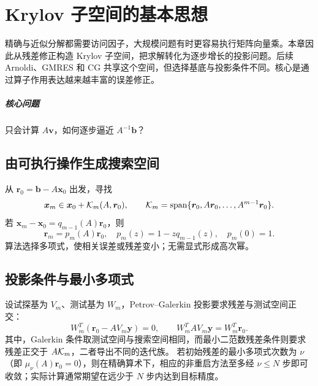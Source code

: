 \chapter{Krylov 子空间的基本思想}\label{v0ch:10}
\begin{chaptersummary}
精确与近似分解都需要访问因子，大规模问题有时更容易执行矩阵向量乘。本章因此从残差修正构造 Krylov 子空间，把求解转化为逐步增长的投影问题。后续 Arnoldi、GMRES 和 CG 共享这个空间，但选择基底与投影条件不同。核心是通过算子作用表达越来越丰富的误差修正。
\end{chaptersummary}
\paragraph{核心问题}只会计算 $A\bm v$，如何逐步逼近 $A^{-1}\bm b$？

\section{由可执行操作生成搜索空间}
从 $\bm r_0=\bm b-A\bm x_0$ 出发，寻找
\[
 \bm x_m\in\bm x_0+\mathcal K_m(A,\bm r_0),\qquad
 \mathcal K_m=\operatorname{span}\{\bm r_0,A\bm r_0,\ldots,A^{m-1}\bm r_0\}.
\]
若 $\bm x_m-\bm x_0=q_{m-1}(A)\bm r_0$，则
\[
 \bm r_m=p_m(A)\bm r_0,\quad
 p_m(z)=1-zq_{m-1}(z),\quad p_m(0)=1.
\]
算法选择多项式，使相关误差或残差变小；无需显式形成高次幂。
\section{投影条件与最小多项式}
设试探基为 $V_m$、测试基为 $W_m$，Petrov--Galerkin 投影要求残差与测试空间正交：
\[
 W_m^T(\bm r_0-AV_m\bm y)=0,\qquad
 W_m^TAV_m\bm y=W_m^T\bm r_0.
\]
其中，Galerkin 条件取测试空间与搜索空间相同，而最小二范数残差条件则要求残差正交于 $A\mathcal K_m$，二者导出不同的迭代族。
若初始残差的最小多项式次数为 $\nu$（即 $\mu_\nu(A)\bm r_0=0$），则在精确算术下，相应的非重启方法至多经 $\nu\le N$ 步即可收敛；实际计算通常期望在远少于 $N$ 步内达到目标精度。
